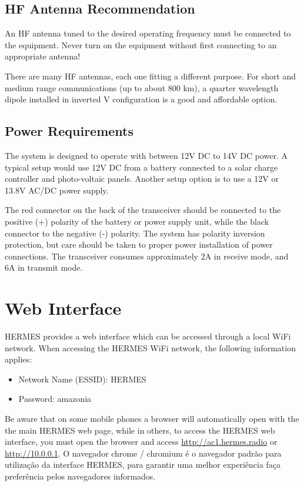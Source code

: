 \documentclass[11pt,a4paper]{article}
\begin{document}
\subsection{HF Antenna Recommendation}

An HF antenna tuned to the desired operating frequency must be connected to the equipment. Never turn on the equipment without first connecting to an appropriate antenna!

There are many HF antennas, each one fitting a different purpose. For short and medium range communications (up to about 800 km), a quarter wavelength dipole installed in inverted V configuration is a good and affordable option. %

\subsection{Power Requirements}

The system is designed to operate with between 12V DC to 14V DC power. A typical setup would use 12V DC from a battery connected to a solar charge controller and photo-voltaic panels. Another setup option is to use a 12V or 13.8V AC/DC power supply. 

The red connector on the back of the transceiver should be connected to the positive (+) polarity of the battery or power supply unit, while the black connector to the negative (-) polarity. The system has polarity inversion protection, but care should be taken to proper power installation of power connections. The transceiver consumes approximately 2A in receive mode, and 6A in transmit mode. %

\section{Web Interface}

HERMES provides a web interface which can be accessed through a local WiFi network. When accessing the HERMES WiFi network, the following information applies:
\begin{itemize}
    \item Network Name (ESSID): HERMES
    \item Password: amazonia
\end{itemize}

Be aware that on some mobile phones a browser will automatically open with the the main HERMES web page, while in others, to access the HERMES web interface, you must open the browser and access \url{http://ac1.hermes.radio} or \url{http://10.0.0.1}. 
\linebreak
\linebreak
O navegador chrome / chromium é o navegador padrão para utilização da interface HERMES, para garantir uma melhor experiência faça preferência pelos navegadores informados.
\end{document}

